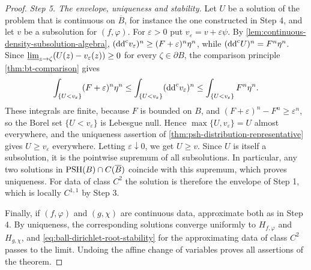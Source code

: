 \begin{proof}
\emph{Step 5. The envelope, uniqueness and stability.}
Let $U$ be a solution of the problem that is continuous on $\overline B$, for instance the one constructed in Step 4, and let $v$ be a subsolution for $(f,\varphi)$. For $\varepsilon>0$ put $v_\varepsilon=v+\varepsilon\psi$. By \cref{lem:continuous-density-subsolution-algebra}, $(\mathrm{dd}^{\mathrm{c}} v_\varepsilon)^n\ge(F+\varepsilon)^n\eta^n$, while $(\mathrm{dd}^{\mathrm{c}} U)^n=F^n\eta^n$. Since $\varliminf_{z\to\zeta}(U(z)-v_\varepsilon(z))\ge0$ for every $\zeta\in\partial B$, the comparison principle \cref{thm:bt-comparison} gives
\[
 \int_{\{U<v_\varepsilon\}}(F+\varepsilon)^n\eta^n
 \le\int_{\{U<v_\varepsilon\}}(\mathrm{dd}^{\mathrm{c}} v_\varepsilon)^n
 \le\int_{\{U<v_\varepsilon\}}F^n\eta^n.
\]
These integrals are finite, because $F$ is bounded on $B$, and $(F+\varepsilon)^n-F^n\ge\varepsilon^n$, so the Borel set $\{U<v_\varepsilon\}$ is Lebesgue null. Hence $\max\{U,v_\varepsilon\}=U$ almost everywhere, and the uniqueness assertion of \cref{thm:psh-distribution-representative} gives $U\ge v_\varepsilon$ everywhere. Letting $\varepsilon\downarrow0$, we get $U\ge v$. Since $U$ is itself a subsolution, it is the pointwise supremum of all subsolutions. In particular, any two solutions in $\mathrm{PSH}(B)\cap C(\overline B)$ coincide with this supremum, which proves uniqueness. For data of class $C^2$ the solution is therefore the envelope of Step 1, which is locally $C^{1,1}$ by Step 3.

Finally, if $(f,\varphi)$ and $(g,\chi)$ are continuous data, approximate both as in Step 4. By uniqueness, the corresponding solutions converge uniformly to $H_{f,\varphi}$ and $H_{g,\chi}$, and \eqref{eq:ball-dirichlet-root-stability} for the approximating data of class $C^2$ passes to the limit. Undoing the affine change of variables proves all assertions of the theorem.
\end{proof}

